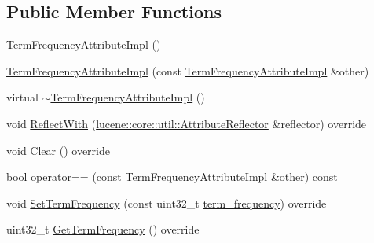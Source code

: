 \subsection*{Public Member Functions}
\begin{DoxyCompactItemize}
\item 
\mbox{\hyperlink{classlucene_1_1core_1_1analysis_1_1tokenattributes_1_1TermFrequencyAttributeImpl_aeda77a35eb6567e63179774e10c1d486}{Term\+Frequency\+Attribute\+Impl}} ()
\item 
\mbox{\hyperlink{classlucene_1_1core_1_1analysis_1_1tokenattributes_1_1TermFrequencyAttributeImpl_a624ed9c4181bde8cca574e75296cde79}{Term\+Frequency\+Attribute\+Impl}} (const \mbox{\hyperlink{classlucene_1_1core_1_1analysis_1_1tokenattributes_1_1TermFrequencyAttributeImpl}{Term\+Frequency\+Attribute\+Impl}} \&other)
\item 
virtual \mbox{\hyperlink{classlucene_1_1core_1_1analysis_1_1tokenattributes_1_1TermFrequencyAttributeImpl_ad294177d45b1697153b141eddcdecd50}{$\sim$\+Term\+Frequency\+Attribute\+Impl}} ()
\item 
void \mbox{\hyperlink{classlucene_1_1core_1_1analysis_1_1tokenattributes_1_1TermFrequencyAttributeImpl_aef08e2be7b9a57329ed5df12fcb2a9d9}{Reflect\+With}} (\mbox{\hyperlink{namespacelucene_1_1core_1_1util_a7dbb701adaed055f73fb95eec83da10a}{lucene\+::core\+::util\+::\+Attribute\+Reflector}} \&reflector) override
\item 
void \mbox{\hyperlink{classlucene_1_1core_1_1analysis_1_1tokenattributes_1_1TermFrequencyAttributeImpl_aaa575565a7b466b6bdcf4d8042f3f582}{Clear}} () override
\item 
bool \mbox{\hyperlink{classlucene_1_1core_1_1analysis_1_1tokenattributes_1_1TermFrequencyAttributeImpl_aa49e2039c1274b9182bce2c23d52c806}{operator==}} (const \mbox{\hyperlink{classlucene_1_1core_1_1analysis_1_1tokenattributes_1_1TermFrequencyAttributeImpl}{Term\+Frequency\+Attribute\+Impl}} \&other) const
\item 
void \mbox{\hyperlink{classlucene_1_1core_1_1analysis_1_1tokenattributes_1_1TermFrequencyAttributeImpl_a7662b5bc48f8914a3df96ea22b742e5f}{Set\+Term\+Frequency}} (const uint32\+\_\+t \mbox{\hyperlink{classlucene_1_1core_1_1analysis_1_1tokenattributes_1_1TermFrequencyAttributeImpl_a94d743632e8edd5e9e05ce039eec16e8}{term\+\_\+frequency}}) override
\item 
uint32\+\_\+t \mbox{\hyperlink{classlucene_1_1core_1_1analysis_1_1tokenattributes_1_1TermFrequencyAttributeImpl_adfd47f9d692a2fbe7a48d590f8c585cb}{Get\+Term\+Frequency}} () override

\end{DoxyCompactItemize}
